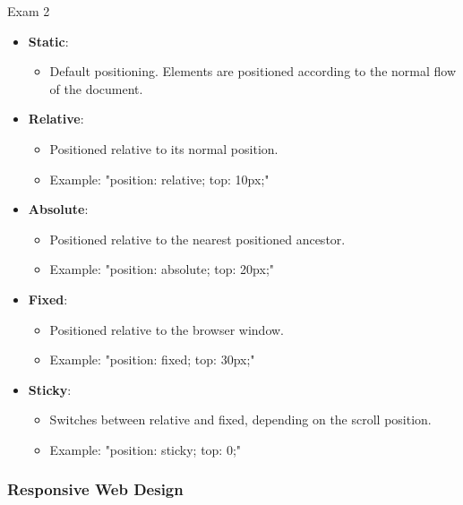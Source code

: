 \begin{examnotes}{Exam 2}
\begin{highlight}
        \begin{itemize}
            \item \textbf{Static}:
                \begin{itemize}
                    \item Default positioning. Elements are positioned according to the normal flow of the document.
                \end{itemize}
            \item \textbf{Relative}:
                \begin{itemize}
                    \item Positioned relative to its normal position.
                    \item Example: "position: relative; top: 10px;"
                \end{itemize}
            \item \textbf{Absolute}:
                \begin{itemize}
                    \item Positioned relative to the nearest positioned ancestor.
                    \item Example: "position: absolute; top: 20px;"
                \end{itemize}
            \item \textbf{Fixed}:
                \begin{itemize}
                    \item Positioned relative to the browser window.
                    \item Example: "position: fixed; top: 30px;"
                \end{itemize}
            \item \textbf{Sticky}:
                \begin{itemize}
                    \item Switches between relative and fixed, depending on the scroll position.
                    \item Example: "position: sticky; top: 0;"
                \end{itemize}
        \end{itemize}
    \end{highlight}
    
    \subsubsection*{Responsive Web Design}
    

\end{examnotes}
